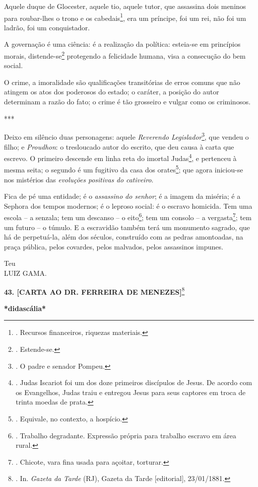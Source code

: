 Aquele duque de Glocester, aquele tio, aquele tutor, que assassina dois
meninos para roubar-lhes o trono e os cabedais\footnote{. Recursos
  financeiros, riquezas materiais.}, era um príncipe, foi um rei, não
foi um ladrão, foi um conquistador.

A governação é uma ciência: é a realização da política: esteia-se em
princípios morais, distende-se\footnote{. Estende-se.} protegendo a
felicidade humana, visa a consecução do bem social.

O crime, a imoralidade são qualificações transitórias de erros comuns
que não atingem os atos dos poderosos do estado; o caráter, a posição do
autor determinam a razão do fato; o crime é tão grosseiro e vulgar como
os criminosos.

***

Deixo em silêncio duas personagens: aquele \emph{Reverendo
Legislador}\footnote{. O padre e senador Pompeu.}, que vendeu o filho; e
\emph{Proudhon}: o tresloucado autor do escrito, que deu causa à carta
que escrevo. O primeiro descende em linha reta do imortal
Judas\footnote{. Judas Iscariot foi um dos doze primeiros discípulos de
  Jesus. De acordo com os Evangelhos, Judas traiu e entregou Jesus para
  seus captores em troca de trinta moedas de prata.}, e pertenceu à
mesma seita; o segundo é um fugitivo da casa dos orates\footnote{.
  Equivale, no contexto, a hospício.}; que agora iniciou-se nos
mistérios das \emph{evoluções positivas do cativeiro}.

Fica de pé uma entidade; é o \emph{assassino do senhor}; é a imagem da
miséria; é a Sephora dos tempos modernos; é o leproso social: é o
escravo homicida. Tem uma escola -- a senzala; tem um descanso -- o
eito\footnote{. Trabalho degradante. Expressão própria para trabalho
  escravo em área rural.}; tem um consolo -- a vergasta\footnote{.
  Chicote, vara fina usada para açoitar, torturar.}; tem um futuro -- o
túmulo. E a escravidão também terá um monumento sagrado, que há de
perpetuá-la, além dos séculos, construído com as pedras amontoadas, na
praça pública, pelos covardes, pelos malvados, pelos assassinos impunes.

Teu\\
LUIZ GAMA.

\textbf{43. {[}CARTA AO DR. FERREIRA DE MENEZES{]}}\footnote{. In.
  \emph{Gazeta da Tarde} (RJ), Gazeta da Tarde {[}editorial{]},
  23/01/1881.}

\textbf{*didascália*}

